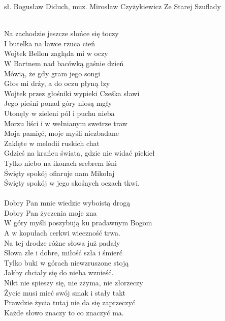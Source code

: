 {sł. Bogusław Diduch, muz. Mirosław Czyżykiewicz}
{Ze Starej Szuflady}
\begin{text}
\vin\\
\vin Na zachodzie jeszcze słońce się toczy\\
\vin I butelka na ławce rzuca cień\\
\vin Wojtek Bellon zagląda mi w oczy\\
\vin W Bartnem nad bacówką gaśnie dzień\\
\vin Mówią, że gdy gram jego songi\\
\vin Głos mi drży, a do oczu płyną łzy\\
\vin Wojtek przez głośniki wypieki Cześka sławi\\
\vin Jego pieśni ponad góry niosą mgły\\

Utonęły w zieleni pól i puchu nieba\\
Morzu liści i w wełnianym swetrze traw\\
Moja pamięć, moje myśli niezbadane\\
Zaklęte w melodii ruskich chat\\

Gdzieś na krańcu świata, gdzie nie widać piekieł\\
Tylko niebo na ikonach srebrem lśni\\
Święty spokój ofiaruje nam Mikołaj\\
Święty spokój w jego skośnych oczach tkwi.\\

\vin\\
\vin Dobry Pan mnie wiedzie wyboistą drogą\\
\vin Dobry Pan życzenia moje zna\\
\vin W góry myśli poszybują ku pradawnym Bogom\\
\vin A w kopułach cerkwi wieczność trwa.\\

\vin Na tej drodze różne słowa już padały\\
\vin Słowa złe i dobre, miłość szła i śmierć\\
\vin Tylko buki w górach niewzruszone stoją\\
\vin Jakby chciały się do nieba wznieść.\\

Nikt nie spieszy się, nie zżyma, nie złorzeczy\\
Życie musi mieć swój smak i stały takt\\
Prawdzie życia tutaj nie da się zaprzeczyć\\
Każde słowo znaczy to co znaczyć ma.\\


\end{text}

